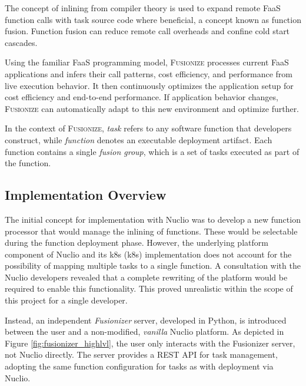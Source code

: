 The concept of inlining from compiler theory is used to expand remote FaaS
function calls with task source code where beneficial, a concept known as
function fusion. Function fusion can reduce remote call overheads and confine
cold start cascades.

Using the familiar FaaS programming model, \textsc{Fusionize} processes current
FaaS applications and infers their call patterns, cost efficiency, and
performance from live execution behavior. It then continuously optimizes the
application setup for cost efficiency and end-to-end performance. If application
behavior changes, \textsc{Fusionize} can automatically adapt to this new
environment and optimize further.

In the context of \textsc{Fusionize}, \emph{task} refers to any software
function that developers construct, while \emph{function} denotes an executable
deployment artifact. Each function contains a single \emph{fusion group}, which
is a set of tasks executed as part of the function.

\subsection{Implementation Overview}

The initial concept for implementation with Nuclio was to develop a new function
processor that would manage the inlining of functions. These would be selectable
during the function deployment phase. However, the underlying platform component
of Nuclio and its k8s (k8s) implementation does not account for the
possibility of mapping multiple tasks to a single function. A consultation with
the Nuclio developers revealed that a complete rewriting of the platform would
be required to enable this functionality. This proved unrealistic within the
scope of this project for a single developer.

Instead, an independent \emph{Fusionizer} server, developed in Python, is
introduced between the user and a non-modified, \emph{vanilla} Nuclio platform.
As depicted in Figure \ref{fig:fusionizer_highlvl}, the user only interacts with
the Fusionizer server, not Nuclio directly. The server provides a REST API for
task management, adopting the same function configuration for tasks as with
deployment via Nuclio.

